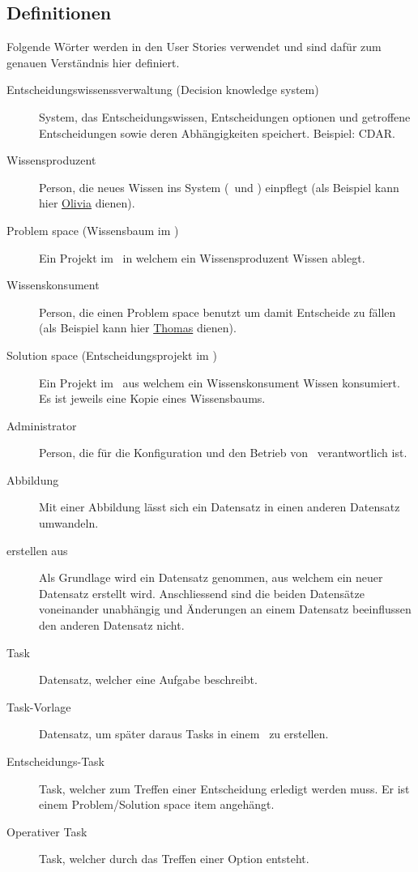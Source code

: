 	\subsection{Definitionen}\label{userstoryDefinitions}
		Folgende Wörter werden in den User Stories verwendet und sind dafür zum genauen Verständnis hier definiert.
		\begin{description}			
			\item[Entscheidungswissenssverwaltung (Decision knowledge system)] System, das Entscheidungswissen, Entscheidungen optionen und getroffene Entscheidungen sowie deren Abhängigkeiten speichert. Beispiel: CDAR.
			\item[Wissensproduzent] Person, die neues Wissen ins System (\cdar\ und \eeppi) einpflegt (als Beispiel kann hier \hyperref[olivia]{Olivia} dienen).
			\item[Problem space (Wissensbaum im \cdar)] Ein Projekt im \cdar\, in welchem ein Wissensproduzent Wissen ablegt.
			\item[Wissenskonsument] Person, die einen Problem space benutzt um damit Entscheide zu fällen (als Beispiel kann hier \hyperref[thomas]{Thomas} dienen).
			\item[Solution space (Entscheidungsprojekt im \cdar)] Ein Projekt im \cdar\, aus welchem ein Wissenskonsument Wissen konsumiert.
				Es ist jeweils eine Kopie eines Wissensbaums.
			\item[Administrator] Person, die für die Konfiguration und den Betrieb von \eeppi\ verantwortlich ist.
			\item[Abbildung] Mit einer Abbildung lässt sich ein Datensatz in einen anderen Datensatz umwandeln.
			\item[erstellen aus] Als Grundlage wird ein Datensatz genommen, aus welchem ein neuer Datensatz erstellt wird.
				Anschliessend sind die beiden Datensätze voneinander unabhängig und Änderungen an einem Datensatz beeinflussen den anderen Datensatz nicht.
			\item[Task] Datensatz, welcher eine Aufgabe beschreibt.
			\item[Task-Vorlage] Datensatz, um später daraus Tasks in einem \ppt\ zu erstellen.
			\item[Entscheidungs-Task] Task, welcher zum Treffen einer Entscheidung erledigt werden muss.
				Er ist einem Problem/Solution space item angehängt.
			\item[Operativer Task] Task, welcher durch das Treffen einer Option entsteht.

\end{description}
